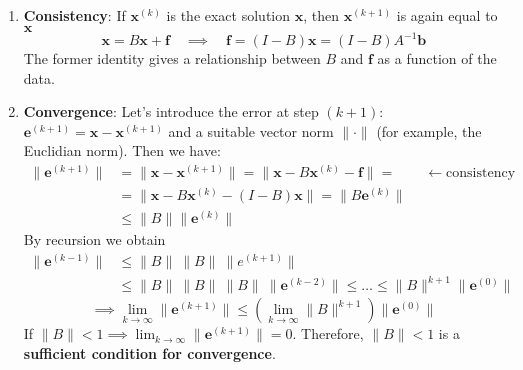 \begin{enumerate}
    \item \textbf{Consistency}: If $\mathbf{x}^{(k)}$ is the exact solution $\mathbf{x}$, then $\mathbf{x}^{(k+1)}$ is again equal to $\mathbf{x}$
          \begin{equation*}
              \mathbf{x} = B\mathbf{x} + \mathbf{f} \quad \implies \quad \mathbf{f} = (I - B) \mathbf{x} = (I - B)A^{-1} \mathbf{b}
          \end{equation*}
          The former identity gives a relationship between $B$ and $\mathbf{f}$ as a function of the data.
    \item \textbf{Convergence}: Let's introduce the error at step $(k+1)$: $\mathbf{e}^{(k+1)} = \mathbf{x} - \mathbf{x}^{(k+1)}$ and a suitable vector norm $\lVert \cdot \rVert$ (for example, the Euclidian norm).
          Then we have:
          \begin{align*}
              \lVert \mathbf{e}^{(k+1)} \rVert & = \lVert \mathbf{x} - \mathbf{x}^{(k+1)} \rVert = \lVert \mathbf{x} - B \mathbf{x}^{(k)} - \mathbf{f} \rVert   = \qquad \gets \text{consistency} \\[1em]
                                               & = \lVert \mathbf{x} - B \mathbf{x}^{(k)} - (I - B)\mathbf{x} \rVert = \lVert B \mathbf{e}^{(k)} \rVert                                           \\[1em]
                                               & \leq \lVert B \rVert \lVert \mathbf{e}^{(k)} \rVert
          \end{align*}
          By recursion we obtain
          \begin{align*}
              \lVert  \mathbf{e}^{(k-1)} \rVert & \leq \lVert B \rVert \ \lVert B \rVert \ \lVert e^{(k+1)} \rVert                                                                                                   \\[1em]
                                                & \leq \lVert B \rVert \ \lVert B \rVert \ \lVert B \rVert  \ \lVert \mathbf{e}^{(k-2)} \rVert \leq \dots \leq \lVert B \rVert ^{k+1} \lVert \mathbf{e}^{(0)} \rVert
          \end{align*}
          \begin{equation*}
              \implies \lim_{ k \to \infty } \lVert \mathbf{e}^{(k+1)} \rVert \leq \left(\lim_{ k \to \infty } \lVert B \rVert ^{k+1} \right) \lVert \mathbf{e}^{(0)} \rVert
          \end{equation*}
          If $\displaystyle \lVert B \rVert < 1 \implies \lim_{ k \to \infty } \lVert \mathbf{e}^{(k+1)} \rVert = 0$. Therefore, $\lVert B \rVert < 1$ is a \textbf{sufficient condition for convergence}.
\end{enumerate}


